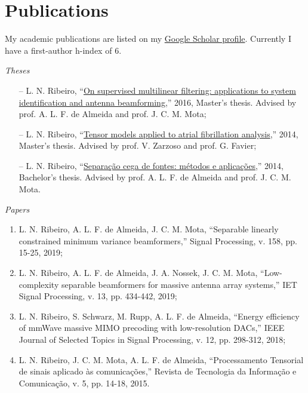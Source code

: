 \section{Publications}

My academic publications are listed on my \href{https://scholar.google.com.br/citations?user=STk6opQAAAAJ}{Google Scholar profile}. Currently I have a first-author h-index of $6$.

{\sl Theses}

\begin{itemize}
	\item[--] L. N. Ribeiro, ``\href{http://www.repositorio.ufc.br/bitstream/riufc/16516/1/2016_dis_lnribeiro.pdf}{On supervised multilinear filtering: applications to system identification and antenna beamforming},'' 2016, Master's thesis. Advised by prof. A. L. F. de Almeida and prof. J. C. M. Mota;
	\item[--] L. N. Ribeiro, ``\href{https://github.com/lnribeiro/lnribeiro.github.io/blob/master/assets/pdf/rapport.pdf}{Tensor models applied to atrial fibrillation analysis},'' 2014, Master's thesis. Advised by prof. V. Zarzoso and prof. G. Favier;
	\item[--] L. N. Ribeiro, ``\href{https://github.com/lnribeiro/lnribeiro.github.io/blob/master/assets/pdf/monografia.pdf}{Separação cega de fontes: métodos e aplicações},'' 2014, Bachelor's thesis. Advised by prof. A. L. F. de Almeida and prof. J. C. M. Mota.
\end{itemize}

{\sl Papers}

\begin{enumerate}
	\item L. N. Ribeiro, A. L. F. de Almeida, J. C. M. Mota, ``Separable linearly constrained minimum variance beamformers,'' Signal Processing, v. 158, pp. 15-25, 2019;
	
	\item L. N. Ribeiro, A. L. F. de Almeida, J. A. Nossek, J. C. M. Mota, ``Low-complexity separable beamformers for massive antenna array systems,'' IET Signal Processing, v. 13, pp. 434-442, 2019;
	
	\item L. N. Ribeiro, S. Schwarz, M. Rupp, A. L. F. de Almeida, ``Energy efficiency of mmWave massive MIMO precoding with low-resolution DACs,'' IEEE Journal of Selected Topics in Signal Processing, v. 12, pp. 298-312, 2018;
	
	\item L. N. Ribeiro, J. C. M. Mota, A. L. F. de Almeida, ``Processamento Tensorial de sinais aplicado às comunicações,'' Revista de Tecnologia da Informação e Comunicação, v. 5, pp. 14-18, 2015.
\end{enumerate}

